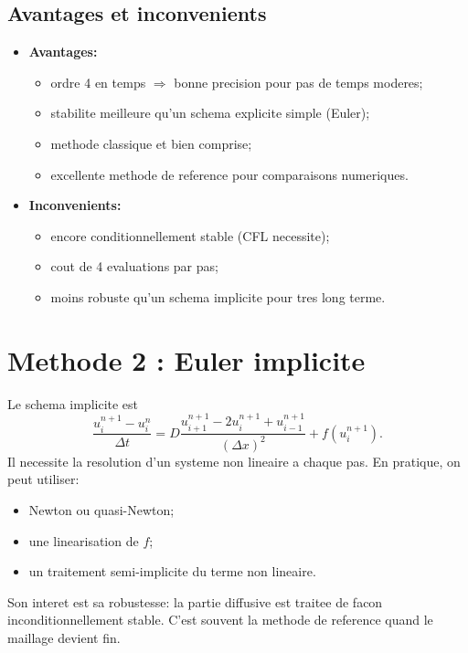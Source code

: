\documentclass[11pt,a4paper]{report}
\begin{document}
\subsection*{Avantages et inconvenients}
\begin{itemize}[leftmargin=1.5em]
  \item \textbf{Avantages:}
    \begin{itemize}[leftmargin=1.5em]
      \item ordre 4 en temps $\Rightarrow$ bonne precision pour pas de temps moderes;
      \item stabilite meilleure qu'un schema explicite simple (Euler);
      \item methode classique et bien comprise;
      \item excellente methode de reference pour comparaisons numeriques.
    \end{itemize}
  \item \textbf{Inconvenients:}
    \begin{itemize}[leftmargin=1.5em]
      \item encore conditionnellement stable (CFL necessite);
      \item cout de 4 evaluations par pas;
      \item moins robuste qu'un schema implicite pour tres long terme.
    \end{itemize}
\end{itemize}

\section{Methode 2 : Euler implicite}
Le schema implicite est
\begin{equation}
\frac{u_i^{n+1}-u_i^n}{\Delta t} = D\frac{u_{i+1}^{n+1}-2u_i^{n+1}+u_{i-1}^{n+1}}{(\Delta x)^2} + f(u_i^{n+1}).
\end{equation}
Il necessite la resolution d'un systeme non lineaire a chaque pas.
En pratique, on peut utiliser:
\begin{itemize}[leftmargin=1.5em]
  \item Newton ou quasi-Newton;
  \item une linearisation de $f$;
  \item un traitement semi-implicite du terme non lineaire.
\end{itemize}

Son interet est sa robustesse: la partie diffusive est traitee de facon inconditionnellement
stable. C'est souvent la methode de reference quand le maillage devient fin.
\end{document}
